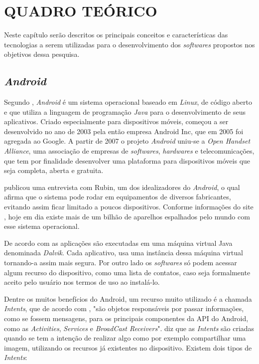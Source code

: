 \chapter{QUADRO TEÓRICO}

	\par Neste capítulo serão descritos os principais conceitos e características
das tecnologias a serem utilizadas para o desenvolvimento dos \textit{softwares}
propostos nos objetivos dessa pesquisa.

\section{\textit{Android}}

	\par Segundo , \textit{Android} é um sistema
operacional baseado em \textit{Linux}, de código aberto e que utiliza a
linguagem de programação \textit{Java} para o desenvolvimento de seus
aplicativos. Criado especialmente para dispositivos móveis, começou a
ser desenvolvido no ano de 2003 pela então empresa Android Inc, que em 2005 foi
agregada ao Google. A partir de 2007 o projeto \textit{Android} uniu-se a
\textit{Open Handset Alliance}, uma associação de empresas de
\textit{softwares}, \textit{hardwares} e telecomunicações, que tem por
finalidade desenvolver uma plataforma para dispositivos móveis que seja
completa, aberta e gratuita.

	\par {} publicou uma entrevista com Rubin, um dos
idealizadores do \textit{Android}, o qual afirma que o sistema pode rodar em
equipamentos de diversos fabricantes, evitando assim ficar limitado a poucos
dispositivos. Conforme informações do site , hoje em dia
existe mais de um bilhão de aparelhos espalhados pelo mundo com esse sistema
operacional.

	\par De acordo com  as aplicações são executadas em
uma máquina virtual Java denominada \textit{Dalvik}. Cada aplicativo, usa uma
instância dessa máquina virtual tornando-a assim mais segura. Por outro lado os
\textit{softwares} só podem acessar algum recurso do dispositivo, como uma
lista de contatos, caso seja formalmente aceito pelo usuário nos termos de uso
ao instalá-lo.

	\par Dentre os muitos benefícios do Android, um recurso muito utilizado é a
chamada \textit{Intents}, que de acordo com , "são
objetos responsáveis por passar informações, como se fossem mensagens, para os
principais componentes da API do Android, como as \textit{Activities},
\textit{Services} e \textit{BroadCast Receivers}". 
diz que as \textit{Intents} são criadas quando se tem a intenção de realizar
algo como por exemplo compartilhar uma imagem, utilizando os recursos já
existentes no dispositivo. Existem dois tipos de \textit{Intents}:
	
